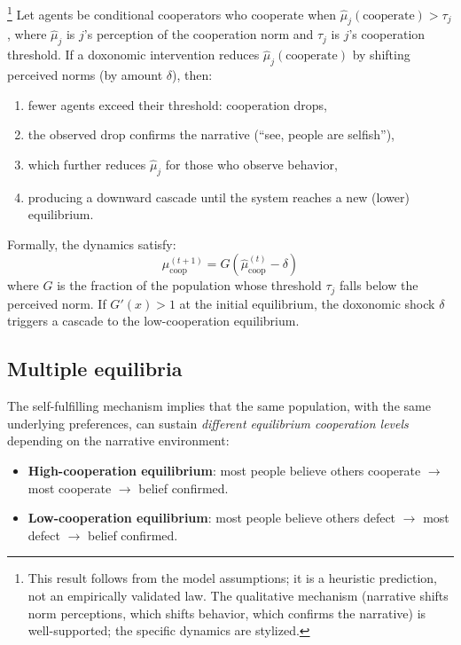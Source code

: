 \begin{proposition}\footnote{This result follows from the model assumptions; it is a heuristic prediction, not an empirically validated law. The qualitative mechanism (narrative shifts norm perceptions, which shifts behavior, which confirms the narrative) is well-supported; the specific dynamics are stylized.}
\label{thm:self-fulfilling}
Let agents be conditional cooperators who cooperate when $\hat{\mu}_j(\text{cooperate}) > \tau_j$, where $\hat{\mu}_j$ is $j$'s perception of the cooperation norm and $\tau_j$ is $j$'s cooperation threshold.
If a doxonomic intervention reduces $\hat{\mu}_j(\text{cooperate})$ by shifting perceived norms (by amount $\delta$), then:
\begin{enumerate}[nosep]
  \item fewer agents exceed their threshold: cooperation drops,
  \item the observed drop confirms the narrative (``see, people are selfish''),
  \item which further reduces $\hat{\mu}_j$ for those who observe behavior,
  \item producing a downward cascade until the system reaches a new (lower) equilibrium.
\end{enumerate}
Formally, the dynamics satisfy:
\[
  \mu^{(t+1)}_{\text{coop}} = G\!\left(\hat{\mu}^{(t)}_{\text{coop}} - \delta\right)
\]
where $G$ is the fraction of the population whose threshold $\tau_j$ falls below the perceived norm.
If $G'(x) > 1$ at the initial equilibrium, the doxonomic shock $\delta$ triggers a cascade to the low-cooperation equilibrium.
\end{proposition}

\subsection{Multiple equilibria}

The self-fulfilling mechanism implies that the same population, with the same underlying preferences, can sustain \emph{different equilibrium cooperation levels} depending on the narrative environment:

\begin{itemize}[nosep]
  \item \textbf{High-cooperation equilibrium}: most people believe others cooperate $\to$ most cooperate $\to$ belief confirmed.
  \item \textbf{Low-cooperation equilibrium}: most people believe others defect $\to$ most defect $\to$ belief confirmed.
\end{itemize}

